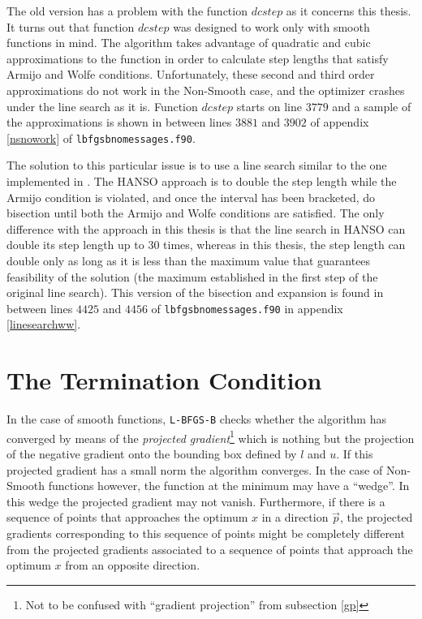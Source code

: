 

The old version has a problem with the function $dcstep$ as it concerns this thesis. It turns out that function $dcstep$ was designed to work only with smooth functions in mind. The algorithm takes advantage of quadratic and cubic approximations to the function in order to calculate step lengths that satisfy Armijo and Wolfe conditions. Unfortunately, these second and third order approximations do not work in the Non-Smooth case, and the optimizer crashes under the line search as it is. Function $dcstep$ starts on line $3779$ and a sample of the approximations is shown in between lines $3881$ and $3902$ of appendix \eqref{nsnowork} of \texttt{lbfgsbnomessages.f90}.

The solution to this particular issue is to use a line search similar to the one implemented in \citep{hanso}. The HANSO approach is to double the step length while the Armijo condition is violated, and once the interval has been bracketed, do bisection until both the Armijo and Wolfe conditions are satisfied. The only difference with the approach in this thesis is that the line search in HANSO can double its step length up to $30$ times, whereas in this thesis, the step length can double only as long as it is less than the maximum value that guarantees feasibility of the solution (the maximum established in the first step of the original line search). This version of the bisection and expansion is found in between lines $4425$ and $4456$ of \texttt{lbfgsbnomessages.f90} in appendix \eqref{linesearchww}. 

\section{The Termination Condition} \label{terminator}

In the case of smooth functions, \texttt{L-BFGS-B} checks whether the algorithm has converged by means of the \emph{projected gradient}\footnote{Not to be confused with ``gradient projection'' from subsection \eqref{gp}} which is nothing but the projection of the negative gradient onto the bounding box defined by $l$ and $u$. If this projected gradient has a small norm the algorithm converges. In the case of Non-Smooth functions however, the function at the minimum may have a ``wedge''. In this wedge the projected gradient may not vanish. Furthermore, if there is a sequence of points that approaches the optimum $x$ in a direction $\vec{p}$, the projected gradients corresponding to this sequence of points might be completely different from the projected gradients associated to a sequence of points that approach the optimum $x$ from an opposite direction.

